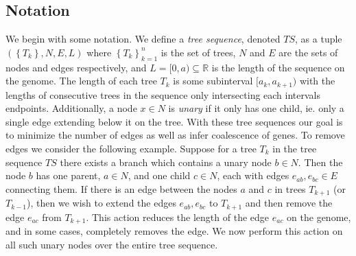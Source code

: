 \documentclass[10pt,twoside,lineno]{gsajnl}
\newcommand{\R}{\mathbb{R}}
\begin{document}
\subsection*{Notation}
    We begin with some notation. We define a \textit{tree sequence}, denoted $TS$, 
    as a tuple $\left( \left\{T_k\right\}, N, E, L\right)$ where
     $\left\{T_k\right\}_{k=1}^n$ is the set of trees,
     $N$ and $E$ are the sets of nodes and edges respectively,
     and $L=[0,a)\subseteq \R$ is the length of the sequence on the genome.
     The length of each tree $T_k$ is some subinterval $[a_k,a_{k+1})$ 
     with the lengths of consecutive trees in the sequence 
     only intersecting each intervals endpoints. 
    Additionally, a node $x\in N$ is \textit{unary} if it only has one child, 
    ie. only a single edge extending below it on the tree.
    With these tree sequences our goal is to
    minimize the number of edges
    as well as infer coalescence of genes. 
    To remove edges we consider the following example.
    Suppose for a tree $T_k$ in the tree sequence $TS$ 
    there exists a branch which contains a unary node $b\in N$.
    Then the node $b$ has one parent, $a\in N$, 
    and one child $c\in N$,
    each with edges $e_{ab}, e_{bc}\in E$ connecting them.
    If there is an edge between the nodes $a$ and $c$ in trees 
    $T_{k+1}$ (or $T_{k-1}$),
    then we wish to extend the edges $e_{ab},e_{bc}$ 
    to $T_{k+1}$ and then remove the edge $e_{ac}$ from $T_{k+1}$. 
    This action reduces the length of the edge $e_{ac}$ on the genome,
    and in some cases, completely removes the edge. 
    We now perform this action on all such unary nodes 
    over the entire tree sequence.
\end{document}
